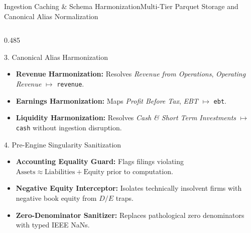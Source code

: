 \begin{frame}{Ingestion Caching \& Schema Harmonization}{Multi-Tier Parquet Storage and Canonical Alias Normalization}
\begin{columns}[T,onlytextwidth]
        \begin{column}{0.485\textwidth}
            \begin{quantcard}[height=2.74cm]{3. Canonical Alias Harmonization}
                \fontsize{5.8pt}{7.0pt}\selectfont
                \begin{itemize}
                    \setlength{\itemsep}{1.2pt}
                    \item \textbf{Revenue Harmonization:} Resolves \textit{Revenue from Operations}, \textit{Operating Revenue} $\mapsto$ \texttt{revenue}.
                    \item \textbf{Earnings Harmonization:} Maps \textit{Profit Before Tax}, \textit{EBT} $\mapsto$ \texttt{ebt}.
                    \item \textbf{Liquidity Harmonization:} Resolves \textit{Cash \& Short Term Investments} $\mapsto$ \texttt{cash} without ingestion disruption.
                \end{itemize}
            \end{quantcard}

            \vspace{0.12cm}

            \begin{quantcard}[height=2.74cm]{4. Pre-Engine Singularity Sanitization}
                \fontsize{5.8pt}{7.0pt}\selectfont
                \begin{itemize}
                    \setlength{\itemsep}{1.2pt}
                    \item \textbf{Accounting Equality Guard:} Flags filings violating $\text{Assets} \approx \text{Liabilities} + \text{Equity}$ prior to computation.
                    \item \textbf{Negative Equity Interceptor:} Isolates technically insolvent firms with negative book equity from $D/E$ traps.
                    \item \textbf{Zero-Denominator Sanitizer:} Replaces pathological zero denominators with typed IEEE NaNs.
                \end{itemize}
            \end{quantcard}
        \end{column}
    \end{columns}
\end{frame}
